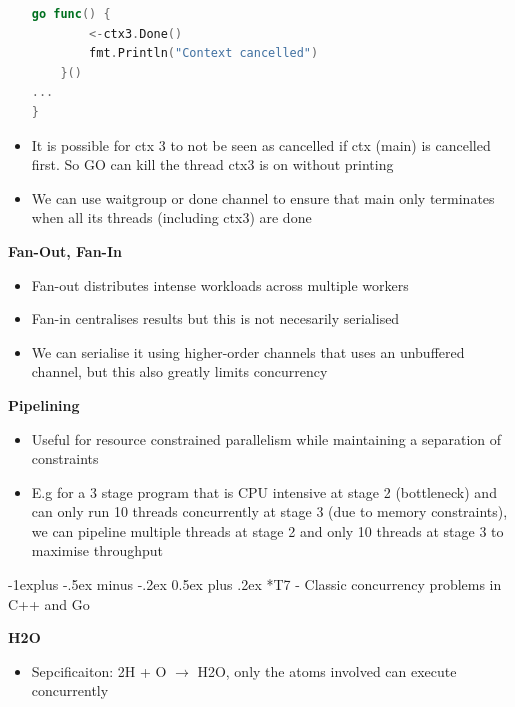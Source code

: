 \documentclass[10pt, landscape]{article}
\makeatletter
\renewcommand{\subsection}{\@startsection{subsection}{2}{0mm}%
                                {-1explus -.5ex minus -.2ex}%
                                {0.5ex plus .2ex}%
                                {\normalfont\normalsize\bfseries}}
\makeatother
\begin{document}
\begin{multicols}{4}
\begin{itemize}
\begin{lstlisting}[language=Go,  breaklines=true, breakatwhitespace=true]
    go func() {
        <-ctx3.Done()
        fmt.Println("Context cancelled")
    }()
...
}
\end{lstlisting}
    \item It is possible for ctx 3 to not be seen as cancelled if ctx (main) is cancelled first. So GO can kill the thread ctx3 is on without printing 
    \item We can use waitgroup or done channel to ensure that main only terminates when all its threads (including ctx3) are done
\end{itemize}

\textbf{Fan-Out, Fan-In} 
\begin{itemize}
    \item Fan-out distributes intense workloads across multiple workers
    \item Fan-in centralises results but this is not necesarily serialised 
    \item We can serialise it using higher-order channels that uses an unbuffered channel, but this also greatly limits concurrency
\end{itemize}

\textbf{Pipelining} \\ 
\begin{itemize}
    \item Useful for resource constrained parallelism while maintaining a separation of constraints
    \item E.g for a 3 stage program that is CPU intensive at stage 2 (bottleneck) and can only run 10 threads concurrently at stage 3 (due to memory constraints), we can pipeline multiple threads at stage 2 and only 10 threads at stage 3 to maximise throughput
\end{itemize}

\subsection*{T7 - Classic concurrency problems in C++ and Go}

\textbf{H2O} \\
\begin{itemize}
    \item Sepcificaiton: 2H + O $\rightarrow$ H2O, only the atoms involved can execute concurrently 
\end{itemize}


\end{multicols}
\end{document}
